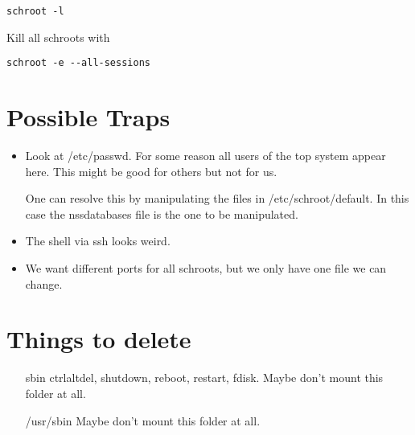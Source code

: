 \documentclass[a4paper]{article}
\begin{document}
\begin{verbatim}
schroot -l
\end{verbatim}

Kill all schroots with

\begin{verbatim}
schroot -e --all-sessions
\end{verbatim}

\section{Possible Traps}
\begin{itemize}
\item Look at /etc/passwd. For some reason all users of the top system appear here. This might be good for others but not for us.

One can resolve this by manipulating the files in /etc/schroot/default. In this case the nssdatabases file is the one to be manipulated.
\item The shell via ssh looks weird.
\item We want different ports for all schroots, but we only have one file we can change.
\end{itemize}

\section{Things to delete}
\begin{itemize}
\item[sbin] ctrlaltdel, shutdown, reboot, restart, fdisk. Maybe don't mount this folder at all.
\item[/usr/sbin] Maybe don't mount this folder at all.
\end{itemize}
\end{document}
